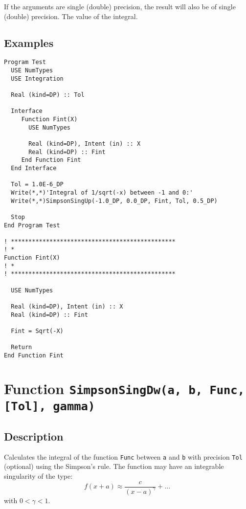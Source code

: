 If the arguments are single (double) precision, the result will also be of
single (double) precision. The value of the integral.


\subsection{Examples}

\begin{lstlisting}[emph=SimpsonSingUP,
                   emphstyle=\color{blue},
                   frame=trBL,
                   caption=Integrating functions with singularities in
                   the upper limit.,
                   label=SimpsonSingUP]
Program Test
  USE NumTypes
  USE Integration

  Real (kind=DP) :: Tol

  Interface 
     Function Fint(X)
       USE NumTypes

       Real (kind=DP), Intent (in) :: X
       Real (kind=DP) :: Fint
     End Function Fint
  End Interface

  Tol = 1.0E-6_DP
  Write(*,*)'Integral of 1/sqrt(-x) between -1 and 0:'
  Write(*,*)SimpsonSingUp(-1.0_DP, 0.0_DP, Fint, Tol, 0.5_DP)

  Stop
End Program Test

! ***********************************************
! *
Function Fint(X)
! *  
! ***********************************************

  USE NumTypes

  Real (kind=DP), Intent (in) :: X
  Real (kind=DP) :: Fint

  Fint = Sqrt(-X)

  Return
End Function Fint
\end{lstlisting}

\section{Function \texttt{SimpsonSingDw(a, b, Func, [Tol], gamma)}}

\subsection{Description}

Calculates the integral of the function \texttt{Func} between
\texttt{a} and \texttt{b} with precision \texttt{Tol} (optional) using
the Simpson's rule. The function may have an integrable singularity of
the type:
\begin{displaymath}
  f(x+a) \approx \frac{c}{(x-a)^\gamma} +  \dots
\end{displaymath}
with $0<\gamma<1$.

